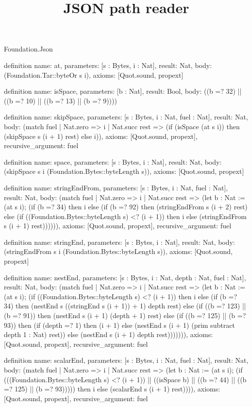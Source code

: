 \begin{lexlean}{Foundation.Json}
\title{JSON path reader}
\begin{semanticmodule}
definition{
  name: at,
  parameters: [s : Bytes, i : Nat],
  result: Nat,
  body: (Foundation.Tar::byteOr s i),
  axioms: [Quot.sound, propext]
}

definition{
  name: isSpace,
  parameters: [b : Nat],
  result: Bool,
  body: ((b =? 32) || ((b =? 10) || ((b =? 13) || (b =? 9))))
}

definition{
  name: skipSpace,
  parameters: [s : Bytes, i : Nat, fuel : Nat],
  result: Nat,
  body: (match fuel
    | Nat.zero => i
    | Nat.succ rest => (if (isSpace (at s i)) then (skipSpace s (i + 1) rest) else i)),
  axioms: [Quot.sound, propext],
  recursive_argument: fuel
}

definition{
  name: space,
  parameters: [s : Bytes, i : Nat],
  result: Nat,
  body: (skipSpace s i (Foundation.Bytes::byteLength s)),
  axioms: [Quot.sound, propext]
}

definition{
  name: stringEndFrom,
  parameters: [s : Bytes, i : Nat, fuel : Nat],
  result: Nat,
  body: (match fuel
    | Nat.zero => i
    | Nat.succ rest => (let b : Nat := (at s i); (if (b =? 34) then i else (if (b =? 92) then (stringEndFrom s (i + 2) rest) else (if ((Foundation.Bytes::byteLength s) <? (i + 1)) then i else (stringEndFrom s (i + 1) rest)))))),
  axioms: [Quot.sound, propext],
  recursive_argument: fuel
}

definition{
  name: stringEnd,
  parameters: [s : Bytes, i : Nat],
  result: Nat,
  body: (stringEndFrom s i (Foundation.Bytes::byteLength s)),
  axioms: [Quot.sound, propext]
}

definition{
  name: nestEnd,
  parameters: [s : Bytes, i : Nat, depth : Nat, fuel : Nat],
  result: Nat,
  body: (match fuel
    | Nat.zero => i
    | Nat.succ rest => (let b : Nat := (at s i); (if ((Foundation.Bytes::byteLength s) <? (i + 1)) then i else (if (b =? 34) then (nestEnd s ((stringEnd s (i + 1)) + 1) depth rest) else (if ((b =? 123) || (b =? 91)) then (nestEnd s (i + 1) (depth + 1) rest) else (if ((b =? 125) || (b =? 93)) then (if (depth =? 1) then (i + 1) else (nestEnd s (i + 1) (prim subtract depth 1 : Nat) rest)) else (nestEnd s (i + 1) depth rest))))))),
  axioms: [Quot.sound, propext],
  recursive_argument: fuel
}

definition{
  name: scalarEnd,
  parameters: [s : Bytes, i : Nat, fuel : Nat],
  result: Nat,
  body: (match fuel
    | Nat.zero => i
    | Nat.succ rest => (let b : Nat := (at s i); (if (((Foundation.Bytes::byteLength s) <? (i + 1)) || ((isSpace b) || ((b =? 44) || ((b =? 125) || (b =? 93))))) then i else (scalarEnd s (i + 1) rest)))),
  axioms: [Quot.sound, propext],
  recursive_argument: fuel
}


\end{semanticmodule}
\end{lexlean}
